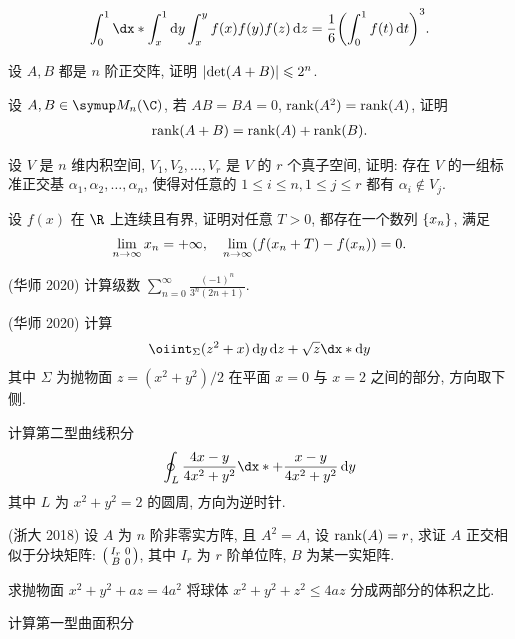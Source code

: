 \begin{exercise}[resume=exer]
\begin{align*}
          \int_{0}^{1} \dx*\int_{x}^{1} \dd{y}\int_{x}^{y}f(x)f(y)f(z)\dd{z} = \frac{1}{6}\qty(\int_{0}^{1}f(t) \dd{t})^{3}.
      \end{align*}
      \item 设 $ A, B $ 都是 $ n $ 阶正交阵, 证明 $ \abs{\det(A+B)} \leqslant 2^{n} $.
      \item 设 $ A, B \in \MM[\C] $, 若 $ AB = BA = 0 $, $ \rank(A^{2}) = \rank(A) $, 证明
      \begin{align*}
          \rank(A+B) = \rank(A) + \rank(B).
      \end{align*}
      \item 设 $ V $ 是 $ n $ 维内积空间,  $ V_{1}, V_{2}, \dots, V_{r} $ 是 $ V $ 的 $ r $ 个真子空间, 证明: 存在 $ V $ 的一组标准正交基 $ \alpha_{1}, \alpha_{2}, \dots, \alpha_{n} $, 使得对任意的 $ 1 \le i \le n, 1\le j \le r $ 都有 $ \alpha_{i} \notin V_{j} $.
      \item 设 $ f(x) $ 在 $ \R $ 上连续且有界, 证明对任意 $ T > 0 $, 都存在一个数列 $ \qty{x_{n}} $, 满足
      \begin{align*}
          \lim_{n \to \infty} x_{n} = +\infty, \quad \lim_{n \to \infty}(f(x_{n}+T) - f(x_{n})) = 0.
      \end{align*}
      \item (华师 2020) 计算级数 $ \sum_{n=0}^{\infty}\frac{(-1)^{n}}{3^{n}(2n+1)} $.
      \item (华师 2020) 计算
      \begin{align*}
          \oiint_{\Sigma} (z^{2}+x) \dd{y}\dd{z} + \sqrt{z} \dx*\dd{y}
      \end{align*}
      其中 $ \Sigma $ 为抛物面 $ z = (x^{2}+y^{2})/2 $ 在平面 $ x=0 $ 与 $ x=2 $ 之间的部分, 方向取下侧.
      \item 计算第二型曲线积分
      \begin{align*}
          \oint_{L} \frac{4x-y}{4x^{2}+y^{2}}\dx* + \frac{x-y}{4x^{2}+y^{2}}\dd{y}
      \end{align*}
      其中 $ L $ 为 $ x^{2} + y^{2} = 2 $ 的圆周, 方向为逆时针.
      \item (浙大 2018) 设 $ A $ 为 $ n $ 阶非零实方阵, 且 $ A^{2} = A $, 设 $ \rank(A) = r $, 求证 $ A $ 正交相似于分块矩阵: $ \smqty(I_{r} & 0 \\ B & 0) $, 其中 $ I_{r} $ 为 $ r $ 阶单位阵, $ B $ 为某一实矩阵.
      \item 求抛物面 $ x^{2} + y^{2} + az = 4a^{2} $ 将球体 $ x^{2} + y^{2} + z^{2} \le 4az $ 分成两部分的体积之比.
      \item 计算第一型曲面积分

\end{exercise}
